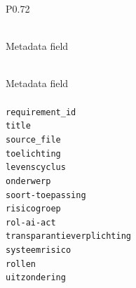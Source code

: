 \begingroup
\small
\setlength{\tabcolsep}{4pt}
\renewcommand{\arraystretch}{1.08}
\setlength{\LTcapwidth}{\textwidth}
\setlength{\LTleft}{0pt plus 1fill}
\setlength{\LTright}{0pt plus 1fill}
\begin{longtable}{P{0.72\textwidth}}
\caption{Metadata fields present in Algoritmekader vereisten files.} \label{tab:algoritmekader-vereisten-metadata-fields} \\
\toprule
Metadata field \\
\midrule
\endfirsthead
\caption[]{Metadata fields present in Algoritmekader vereisten files.} \\
\toprule
Metadata field \\
\midrule
\endhead
\midrule
{} \\
\midrule
\endfoot
\bottomrule
\endlastfoot
\texttt{requirement\_\allowbreak{}id} \\
\texttt{title} \\
\texttt{source\_\allowbreak{}file} \\
\texttt{toelichting} \\
\texttt{levenscyclus} \\
\texttt{onderwerp} \\
\texttt{soort-\allowbreak{}toepassing} \\
\texttt{risicogroep} \\
\texttt{rol-\allowbreak{}ai-\allowbreak{}act} \\
\texttt{transparantieverplichting} \\
\texttt{systeemrisico} \\
\texttt{rollen} \\
\texttt{uitzondering} \\
\end{longtable}
\endgroup
